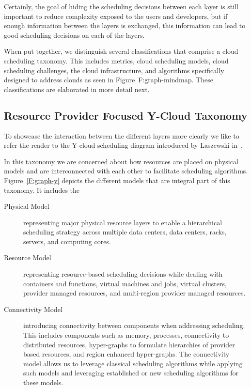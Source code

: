 \documentclass[final,5p,times,twocolumn]{elsarticle}
\begin{document}
Certainly, the goal of hiding the scheduling decisions between each
layer is still important to reduce complexity exposed to the users and
developers, but if enough information between the layers is exchanged,
this information can lead to good scheduling decisions on each of the
layers.

When put together, we distinguish several classifications that
comprise a cloud scheduling taxonomy. This includes
metrics, cloud scheduling models, cloud scheduling challenges, the
cloud infrastructure, and algorithms specifically designed to address
clouds as seen in Figure~{F:graph-mindmap}.  These classifications are
elaborated in more detail next.



\subsection{Resource Provider Focused Y-Cloud Taxonomy}\label{sec:y}

To showcase the interaction between the different layers more clearly
we like to refer the reader to the Y-cloud scheduling diagram
introduced by Laszewski in~\cite{lasbook}.

In this taxonomy we are concerned about how resources are placed on
physical models and are interconnected with each other to facilitate
scheduling algorithms. Figure~\ref{F:graph-y} depicts the different
models that are integral part of this taxonomy. It includes the 

\begin{description}

\item[Physical Model] representing major physical resource layers to
  enable a hierarchical scheduling strategy across multiple data
  centers, data centers, racks, servers, and computing cores.

\item[Resource Model] representing resource-based scheduling
  decisions while dealing with  containers and functions, virtual
  machines and jobs, virtual clusters, provider managed resources, and
  multi-region provider managed resources.

\item[Connectivity Model] introducing connectivity between components
  when addressing scheduling. This includes components such as memory,
  processes, connectivity to distributed resources, hyper-graphs to
  formulate hierarchies of provider based resources, and region
  enhanced hyper-graphs. The connectivity model allows us to leverage
  classical scheduling algorithms while applying such models and
  leveraging established or new scheduling algorithms for these
  models.

\end{description}
\end{document}
